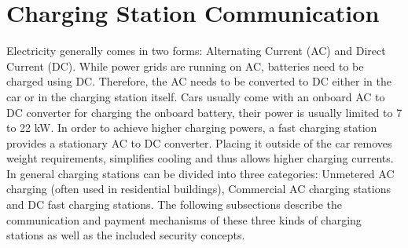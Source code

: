 \documentclass[conference,flushend]{iaria} %
\begin{document}
\section{Charging Station Communication} \label{sec:chargingcommoverview}
Electricity generally comes in two forms: Alternating Current (AC) and Direct Current (DC).
While power grids are running on AC, batteries need to be charged using DC.
Therefore, the AC needs to be converted to DC either in the car or in the charging station itself.
Cars usually come with an onboard AC to DC converter for charging the onboard battery, their power is usually limited to 7 to 22 kW.
In order to achieve higher charging powers, a fast charging station provides a stationary AC to DC converter. Placing it outside of the car removes weight requirements, simplifies cooling and thus allows higher charging currents. \\
In general charging stations can be divided into three categories: Unmetered AC charging (often used in residential buildings), Commercial AC charging stations and DC fast charging stations.
The following subsections describe the communication and payment mechanisms of these three kinds of charging stations as well as the included security concepts.
\end{document}
